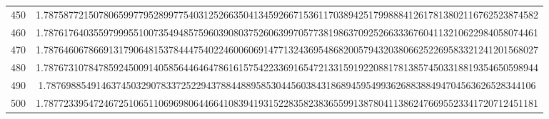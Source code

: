 \documentclass[final]{article}
\begin{document}
\begin{table}
\begin{center}
\begin{tabular}{|c|c|}
450 &   1.787587721507806599779528997754031252663504134592667153611703894251799888412617813802116762523874582   \\
460 &   1.787617640355979995510073549485759603908037526063997057738198637092526633367604113210622984058074461   \\
470 &   1.787646067866913179064815378444754022460060691477132436954868200579432038066252269583321241201568027   \\
480 &   1.787673107847859245009140585644646478616157542233691654721331591922088178138574503318819354650598944   \\
490 &   1.78769885491463745032907833725229437884488958530445603843186894595499362688388494704563626528344106    \\
500 &   1.787723395472467251065110696980644664108394193152283582383655991387804113862476695523341720712451181   \\
\hline
\hline
\end{tabular}
\end{center}
\bigskip\bigskip
\end{table}
\end{document}
